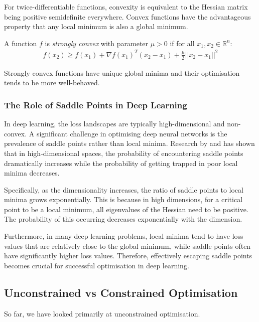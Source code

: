 For twice-differentiable functions, convexity is equivalent to the Hessian matrix being positive semidefinite everywhere. Convex functions have the advantageous property that any local minimum is also a global minimum.

A function $f$ is \textit{strongly convex} with parameter $\mu > 0$ if for all $x_1, x_2 \in \mathbb{R}^n$:
\begin{align}
    f(x_2) \geq f(x_1) + \nabla f(x_1)^T(x_2 - x_1) + \frac{\mu}{2}||x_2 - x_1||^2
\end{align}

Strongly convex functions have unique global minima and their optimisation tends to be more well-behaved.

\subsubsection{The Role of Saddle Points in Deep Learning}

In deep learning, the loss landscapes are typically high-dimensional and non-convex. A significant challenge in optimising deep neural networks is the prevalence of saddle points rather than local minima. Research by \citet{dauphin2014sfn} and \citet{choromanska2015loss} has shown that in high-dimensional spaces, the probability of encountering saddle points dramatically increases while the probability of getting trapped in poor local minima decreases.

Specifically, as the dimensionality increases, the ratio of saddle points to local minima grows exponentially. This is because in high dimensions, for a critical point to be a local minimum, all eigenvalues of the Hessian need to be positive. The probability of this occurring decreases exponentially with the dimension.

Furthermore, in many deep learning problems, local minima tend to have loss values that are relatively close to the global minimum, while saddle points often have significantly higher loss values. Therefore, effectively escaping saddle points becomes crucial for successful optimisation in deep learning.

\subsection{Unconstrained vs Constrained Optimisation}
So far, we have looked primarily at unconstrained optimisation. 